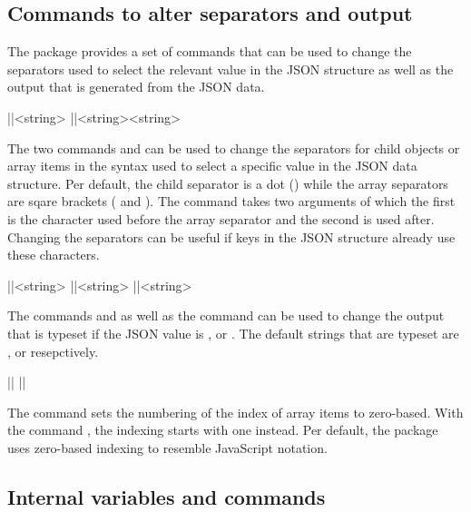 \documentclass[a4paper]{article}
\begin{document}
{{\subsection{Commands to alter separators and output}

The package provides a set of commands that can be used to change the separators used to select the relevant value in the JSON structure as well as the output that is generated from the JSON data.

\begin{macrodef}
|\JSONParseSetChildSeparator|{<string>}
|\JSONParseSetArraySeparator|{<string>}{<string>}
\end{macrodef}
The two commands \macro{\JSONParseSetChildSeparator} and \macro{\JSONParseSetArraySeparator} can be used to change the separators for child objects or array items in the syntax used to select a specific value in the JSON data structure. Per default, the child separator is a dot () while the array separators are sqare brackets (\macro{[} and \macro{]}). The command \macro{\JSONParseSetArraySeparator} takes two arguments of which the first is the character used before the array separator and the second is used after. Changing the separators can be useful if keys in the JSON structure already use these characters.

\begin{macrodef}
|\JSONParseSetTrueString|{<string>}
|\JSONParseSetFalseString|{<string>}
|\JSONParseSetNullString|{<string>}
\end{macrodef}
The commands \macro{\JSONParseSetTrueString} and \macro{\JSONParseSetFalseString} as well as the command \macro{\JSONParseSetNullString} can be used to change the output that is typeset if the JSON value is ,  or . The default strings that are typeset are ,  or  resepctively.

\begin{macrodef}
|\JSONParseSetArrayIndexZeroBased|
|\JSONParseSetArrayIndexOneBased|
\end{macrodef}
The command \macro{\JSONParseSetArrayIndexZeroBased} sets the numbering of the index of array items to zero-based. With the command \macro{\JSONParseSetArrayIndexOneBased}, the indexing starts with one instead. Per default, the package uses zero-based indexing to resemble JavaScript notation.

\subsection{Internal variables and commands}

}}
\end{document}
